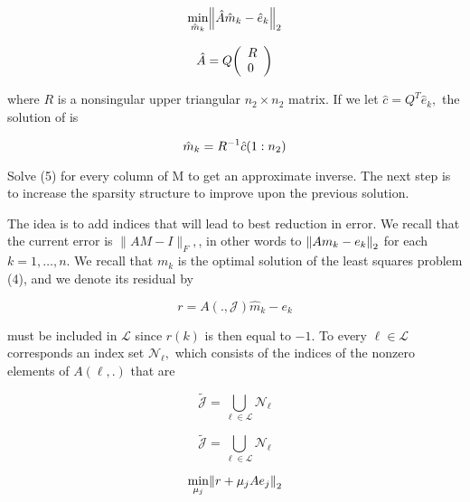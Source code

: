 \documentclass[paper=A4, fontsize=11pt]{scrartcl}
\let\originalleft\left
\let\originalright\right
\renewcommand{\left}{\mathopen{}\mathclose\bgroup\originalleft}
\renewcommand{\right}{\aftergroup\egroup\originalright}
\begin{document}
	\begin{equation}
	\min _{\hat{m}_{k}}\left\|\hat{A} \hat{m}_{k}-\hat{e}_{k}\right\|_{2}
	\end{equation}
	
	
	
	\begin{equation}
	\hat{A}=Q\left(\begin{array}{l}{R} \\ {0}\end{array}\right)
	\end{equation}
	
	where \(R\) is a nonsingular upper triangular \(n_{2} \times n_{2}\) matrix. If we let \(\hat{c}=Q^{T} \hat{e}_{k},\) the
	solution of  is
	
	\begin{equation}
	\hat{m}_{k}=R^{-1} \hat{c}\left(1 : n_{2}\right)
	\end{equation}
	
	Solve (5) for every column of M to get an approximate inverse. The next 
	step is to increase the sparsity structure to improve upon the previous solution.
	
	The idea is to add indices that will lead to best reduction in error. We recall that the current error is \(\|A M-I\|_{F},\), in other words to \(\left\|A m_{k}-e_{k}\right\|_{2}\) for each \(k=1, \ldots, n .\) We recall that \(m_{k}\) is the optimal solution of the least squares problem (4), and we denote its residual by
	
	\begin{equation}
	r=A( ., \mathcal{J}) \hat{m}_{k}-e_{k}
	\end{equation}
	
	must be included in \(\mathcal{L}\) since \(r(k)\) is then equal to \(-1 .\) To every \(\ell \in \mathcal{L}\) corresponds an
	index set \(\mathcal{N}_{\ell},\) which consists of the indices of the nonzero elements of \(A(\ell, .)\) that are
	
	
	\begin{equation}
	\tilde{\mathcal{J}}=\bigcup_{\ell \in \mathcal{L}} \mathcal{N}_{\ell}
	\end{equation}
	
	\begin{equation}
	\tilde{\mathcal{J}}=\bigcup_{\ell \in \mathcal{L}} \mathcal{N}_{\ell}
	\end{equation}
	
	\begin{equation}
	\min _{\mu_{j}}\left\|r+\mu_{j} A e_{j}\right\|_{2}
	\end{equation}
	
\end{document}
